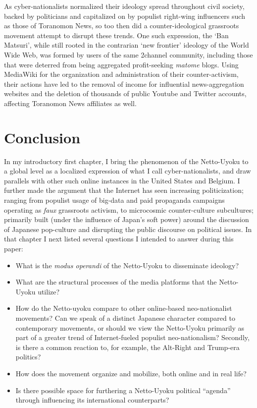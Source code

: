 \documentclass[10pt,british,A4paper,,openany]{memoir}
\providecommand{\tightlist}{%
  \setlength{\itemsep}{0pt}\setlength{\parskip}{0pt}}
\begin{document}
As cyber-nationalists normalized their ideology spread throughout civil
society, backed by politicians and capitalized on by populist right-wing
influencers such as those of Toranomon News, so too then did a
counter-ideological grassroots movement attempt to disrupt these trends.
One such expression, the `Ban Matsuri', while still rooted in the
contrarian `new frontier' ideology of the World Wide Web, was formed by
users of the same 2channel community, including those that were deterred
from being aggregated profit-seeking \emph{matome} blogs. Using
MediaWiki for the organization and administration of their
counter-activism, their actions have led to the removal of income for
influential news-aggregation websites and the deletion of thousands of
public Youtube and Twitter accounts, affecting Toranomon News affiliates
as well.

\newpage

\chapter*{Conclusion}

In my introductory first chapter, I bring the phenomenon of the
Netto-Uyoku to a global level as a localized expression of what I call
cyber-nationalists, and draw parallels with other such online instances
in the United States and Belgium. I further made the argument that the
Internet has seen increasing politicization; ranging from populist usage
of big-data and paid propaganda campaigns operating as \emph{faux}
grassroots activism, to microcosmic counter-culture subcultures;
primarily built (under the influence of Japan's soft power) around the
discussion of Japanese pop-culture and disrupting the public discourse
on political issues. In that chapter I next listed several questions I
intended to answer during this paper:

\begin{itemize}
\tightlist
\item
  What is the \emph{modus operandi} of the Netto-Uyoku to disseminate
  ideology?
\item
  What are the structural processes of the media platforms that the
  Netto-Uyoku utilize?
\item
  How do the Netto-uyoku compare to other online-based neo-nationalist
  movements? Can we speak of a distinct Japanese character compared to
  contemporary movements, or should we view the Netto-Uyoku primarily as
  part of a greater trend of Internet-fueled populist neo-nationalism?
  Secondly, is there a common reaction to, for example, the Alt-Right
  and Trump-era politics?
\item
  How does the movement organize and mobilize, both online and in real
  life?
\item
  Is there possible space for furthering a Netto-Uyoku political
  ``agenda'' through influencing its international counterparts?
\end{itemize}
\end{document}
